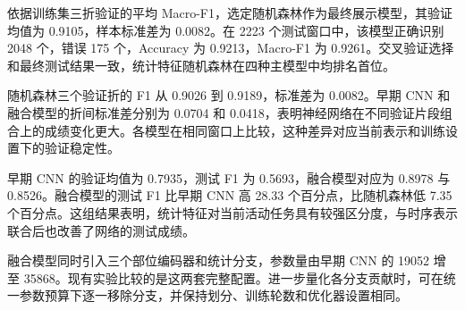 依据训练集三折验证的平均 Macro-F1，选定随机森林作为最终展示模型，其验证均值为 0.9105，样本标准差为 0.0082。在 2223 个测试窗口中，该模型正确识别 2048 个，错误 175 个，Accuracy 为 0.9213，Macro-F1 为 0.9261。交叉验证选择和最终测试结果一致，统计特征随机森林在四种主模型中均排名首位。

随机森林三个验证折的 F1 从 0.9026 到 0.9189，标准差为 0.0082。早期 CNN 和融合模型的折间标准差分别为 0.0704 和 0.0418，表明神经网络在不同验证片段组合上的成绩变化更大。各模型在相同窗口上比较，这种差异对应当前表示和训练设置下的验证稳定性。

早期 CNN 的验证均值为 0.7935，测试 F1 为 0.5693，融合模型对应为 0.8978 与 0.8526。融合模型的测试 F1 比早期 CNN 高 28.33 个百分点，比随机森林低 7.35 个百分点。这组结果表明，统计特征对当前活动任务具有较强区分度，与时序表示联合后也改善了网络的测试成绩。

融合模型同时引入三个部位编码器和统计分支，参数量由早期 CNN 的 19052 增至 35868。现有实验比较的是这两套完整配置。进一步量化各分支贡献时，可在统一参数预算下逐一移除分支，并保持划分、训练轮数和优化器设置相同。